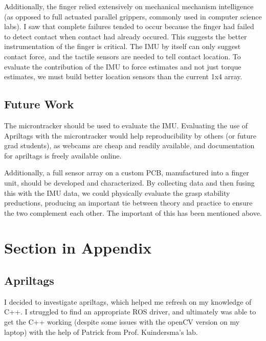 \documentclass[preprint,12pt,3p]{elsarticle}
\begin{document}
Additionally, the finger relied extensively on mechanical mechanism intelligence (as opposed to full
actuated parallel grippers, commonly used in computer science labs).  I saw that complete failures
tended to occur because the finger had failed to detect contact when contact had already occured.
This suggests the better instrumentation of the finger is critical. The IMU by itself can only
suggest contact force, and the tactile sensors are needed to tell contact location. To evaluate the
contribution of the IMU to force estimates and not just torque estimates, we must build better
location sensors than the current 1x4 array.


%
%

\subsection{Future Work}

The microntracker should be used to evaluate the IMU. Evaluating the use of Apriltags with the
microntracker would help reproducibility by others (or future grad students), as webcams are cheap
and readily available, and documentation for apriltags is freely available online.

Additionally, a full sensor array on a custom PCB, manufactured into a finger unit, should be
developed and characterized. By collecting data and then fusing this with the IMU data, we could
physically evaluate the grasp stability preductions, producing an important tie between theory and
practice to ensure the two complement each other. The important of this has been mentioned above.

\appendix

\section{Section in Appendix}

\subsection{Apriltags}
I decided to investigate apriltags, which helped me refresh on my knowledge of C++. I struggled to
find an appropriate ROS driver, and ultimately was able to get the C++ working (despite some issues
with the openCV version on my laptop) with the help of Patrick from Prof. Kuindersma's lab.
\end{document}
